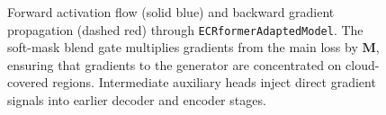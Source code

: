 \begin{figure}[htbp]
\caption{Forward activation flow (solid blue) and backward gradient propagation (dashed red) through \texttt{ECRformerAdaptedModel}. The soft-mask blend gate multiplies gradients from the main loss by $\mathbf{M}$, ensuring that gradients to the generator are concentrated on cloud-covered regions. Intermediate auxiliary heads inject direct gradient signals into earlier decoder and encoder stages.}
\label{fig:backprop_graph}
\end{figure}
